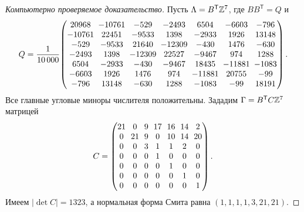 \begin{proof}[Компьютерно проверяемое доказательство]
Пусть $\Lambda=B^{\mathsf T}\mathbb{Z}^7$, где $BB^{\mathsf T}=Q$ и
\[
\begingroup
\setlength{\arraycolsep}{2.6pt}
Q=\frac1{10\,000}\!
\begin{pmatrix}
20968&-10761&-529&-2493&6504&-6603&-796\\
-10761&22451&-9533&1398&-2933&1926&13148\\
-529&-9533&21640&-12309&-430&1476&-630\\
-2493&1398&-12309&22527&-9467&974&1288\\
6504&-2933&-430&-9467&18435&-11881&-1083\\
-6603&1926&1476&974&-11881&20755&-99\\
-796&13148&-630&1288&-1083&-99&18191
\end{pmatrix}.
\endgroup
\]
Все главные угловые миноры числителя положительны. Зададим
$\Gamma=B^{\mathsf T}C\mathbb{Z}^7$ матрицей
\[
\begingroup
\setlength{\arraycolsep}{3.2pt}
C=\begin{pmatrix}
21&0&9&17&16&14&2\\
0&21&9&0&10&14&20\\
0&0&3&1&1&2&0\\
0&0&0&1&0&0&0\\
0&0&0&0&1&0&0\\
0&0&0&0&0&1&0\\
0&0&0&0&0&0&1
\end{pmatrix}.
\endgroup
\]
Имеем $|\det C|=1323$, а нормальная форма Смита равна
$(1,1,1,1,3,21,21)$.


\end{proof}
